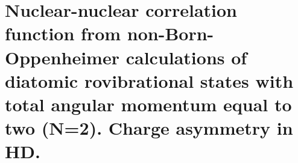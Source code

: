 \chapter{Nuclear-nuclear correlation function from non-Born-Oppenheimer calculations of diatomic rovibrational states with total angular momentum equal to two (N=2). Charge asymmetry in HD.\label{apndx9}}




